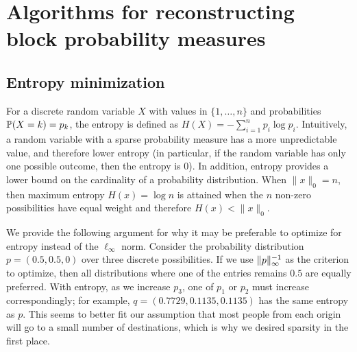 \documentclass{article} %
\begin{document}
\section{Algorithms for reconstructing block probability measures}
\subsection{Entropy minimization}
For a discrete random variable $X$ with values in $\{1, \dots, n\}$ and probabilities $\P(X = k) = p_k$, the entropy is defined as $H(X)  = -\sum_{i=1}^{n} p_i \log p_i$.
Intuitively, a random variable with a sparse probability measure has a more unpredictable value, and therefore lower entropy (in particular, if the random variable has only one possible outcome, then the entropy is 0).
In addition, entropy provides a lower bound on the cardinality of a probability distribution. When $\|x\|_0 = n$, then maximum entropy $H(x) = \log n$ is attained when the $n$ non-zero possibilities have equal weight and therefore $H(x) < \|x\|_0$.

We provide the following argument for why it may be preferable to optimize for entropy instead of the $\ell_\infty$ norm.
Consider the probability distribution $p = (0.5, 0.5, 0)$ over three discrete possibilities.
If we use $\norm{p}_{\infty}^{-1}$ as the criterion to optimize, then all distributions where one of the entries remains $0.5$ are equally preferred.
With entropy, as we increase $p_3$, one of $p_1$ or $p_2$ must increase correspondingly; for example, $q = (0.7729, 0.1135, 0.1135)$ has the same entropy as $p$.
This seems to better fit our assumption that most people from each origin will go to a small number of destinations, which is why we desired sparsity in the first place.
\end{document}
